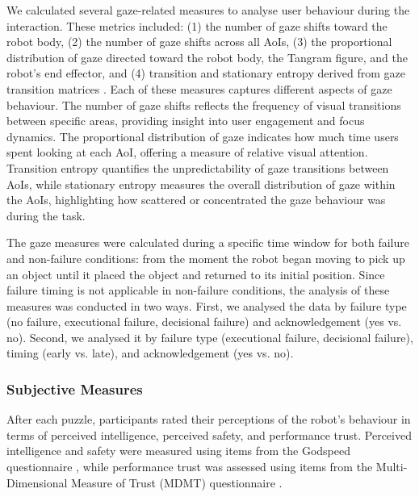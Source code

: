 We calculated several gaze-related measures to analyse user behaviour during the interaction. These metrics included: (1) the number of gaze shifts toward the robot body, (2) the number of gaze shifts across all AoIs, (3) the proportional distribution of gaze directed toward the robot body, the Tangram figure, and the robot’s end effector, and (4) transition and stationary entropy derived from gaze transition matrices \cite{krejtz_gaze_2015, ebeid_analyzing_2019}. Each of these measures captures different aspects of gaze behaviour. The number of gaze shifts reflects the frequency of visual transitions between specific areas, providing insight into user engagement and focus dynamics. The proportional distribution of gaze indicates how much time users spent looking at each AoI, offering a measure of relative visual attention. Transition entropy quantifies the unpredictability of gaze transitions between AoIs, while stationary entropy measures the overall distribution of gaze within the AoIs, highlighting how scattered or concentrated the gaze behaviour was during the task.


The gaze measures were calculated during a specific time window for both failure and non-failure conditions: from the moment the robot began moving to pick up an object until it placed the object and returned to its initial position.
Since failure timing is not applicable in non-failure conditions, the analysis of these measures was conducted in two ways. First, we analysed the data by failure type (no failure, executional failure, decisional failure) and acknowledgement (yes vs. no). Second, we analysed it by failure type (executional failure, decisional failure), timing (early vs. late), and acknowledgement (yes vs. no).


\subsubsection{Subjective Measures}\label{Subjective_Measures}

After each puzzle, participants rated their perceptions of the robot's behaviour in terms of perceived intelligence, perceived safety, and performance trust. Perceived intelligence and safety were measured using items from the Godspeed questionnaire \cite{bartneck_measurement_2009}, while performance trust was assessed using items from the Multi-Dimensional Measure of Trust (MDMT) questionnaire \cite{ullman_mdmt_2023}.

